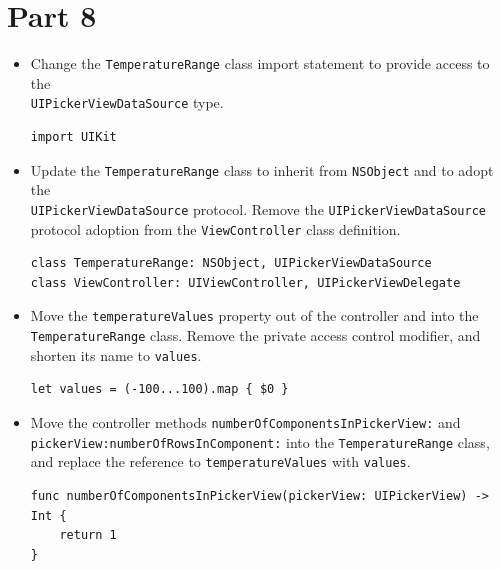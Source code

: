 \documentclass[a4paper,11pt]{scrartcl}
\begin{document}
\section*{Part 8}

\begin{itemize}
\item Change the \texttt{TemperatureRange} class import statement to provide access to the \\\texttt{UIPickerViewDataSource} type.
\begin{lstlisting}
import UIKit
\end{lstlisting}
\item Update the \texttt{TemperatureRange} class to inherit from \texttt{NSObject} and to adopt the \\\texttt{UIPickerViewDataSource} protocol. Remove the \texttt{UIPickerViewDataSource} protocol adoption from the \texttt{ViewController} class definition.
\begin{lstlisting}
class TemperatureRange: NSObject, UIPickerViewDataSource
class ViewController: UIViewController, UIPickerViewDelegate
\end{lstlisting}
\item Move the \texttt{temperatureValues} property out of the controller and into the \texttt{TemperatureRange} class. Remove the private access control modifier, and shorten its name to \texttt{values}.
\begin{lstlisting}
let values = (-100...100).map { $0 }
\end{lstlisting}
\item Move the controller methods \texttt{numberOfComponentsInPickerView:} and \\\texttt{pickerView:numberOfRowsInComponent:} into the \texttt{TemperatureRange} class, and replace the reference to \texttt{temperatureValues} with \texttt{values}.
\begin{lstlisting}
func numberOfComponentsInPickerView(pickerView: UIPickerView) -> Int {
	return 1
}


\end{lstlisting}
\end{itemize}
\end{document}
